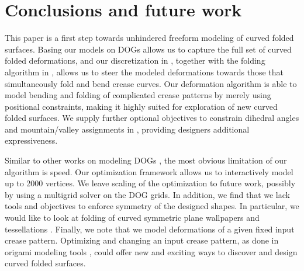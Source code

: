 \section{Conclusions and future work}
This paper is a first step towards unhindered freeform modeling of curved folded surfaces. Basing our models on DOGs \cite{rabi18} allows us to capture the full set of curved folded deformations, and our discretization in , together with the folding algorithm in , allows us to steer the modeled deformations towards those that simultaneously fold and bend crease curves. Our deformation algorithm is able to model bending and folding of complicated crease patterns by merely using positional constraints, making it highly suited for exploration of new curved folded surfaces. We supply further optional objectives to constrain dihedral angles and mountain/valley assignments in , providing designers additional expressiveness. 

Similar to other works on modeling DOGs , the most obvious limitation of our algorithm is speed. Our optimization framework allows us to interactively model up to 2000 vertices. We leave scaling of the optimization to future work, possibly by using a multigrid solver on the DOG grids. In addition, we find that we lack tools and objectives to enforce symmetry of the designed shapes. In particular, we would like to look at folding of curved symmetric plane wallpapers and tessellations \cite{demaine_lens,mundilova2019mathematical}.  Finally, we note that we model deformations of a given fixed input crease pattern. Optimizing and changing an input crease pattern, as done in origami modeling tools \cite{tachi2010freeform}, could offer new and exciting ways to discover and design curved folded surfaces. 